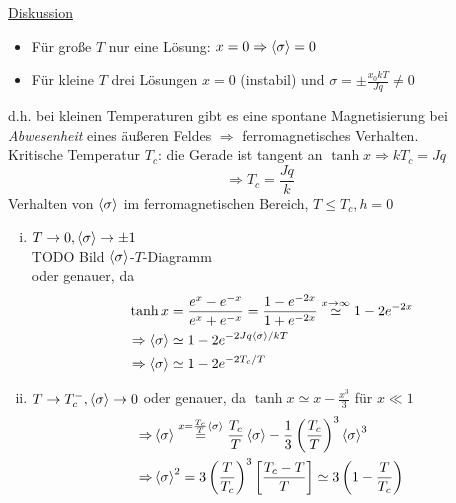 \begin{enumerate}[A)]
    \underline{Diskussion}
    \begin{itemize}
        \item Für große $T$ nur eine Lösung: $x = 0 \Rightarrow \left\langle\sigma\right\rangle = 0$
        \item Für kleine $T$ drei Lösungen $x = 0$ (instabil) und $\sigma = \pm \frac{x_0 k T}{J q} \neq 0$
    \end{itemize}
    d.h. bei kleinen Temperaturen gibt es eine spontane Magnetisierung bei \emph{Abwesenheit} eines äußeren Feldes
    $\Rightarrow$ ferromagnetisches Verhalten. \\
    Kritische Temperatur $T_c$: die Gerade ist tangent an $\tanh x \Rightarrow k T_c = J q$
    \begin{equation}
        \Rightarrow T_c = \frac{J q}{k}
    \end{equation}
    Verhalten von $\left\langle\sigma\right\rangle$ im ferromagnetischen Bereich, $T \leq T_c, h = 0$
    \begin{enumerate}[i)]
        \item $T \to 0, \left\langle\sigma\right\rangle \to \pm 1$ \\
        TODO Bild $\left\langle\sigma\right\rangle$-$T$-Diagramm \\ %
        oder genauer, da
        \begin{equation}
            \begin{split}
                \tanh x &= \frac{e^x - e^{-x}}{e^x + e^{-x}} = \frac{1 - e^{-2x}}{1 + e^{-2x}} \overset{x \to \infty}{\simeq} 1 - 2 e^{-2x} \\
                \Rightarrow \left\langle\sigma\right\rangle &\simeq 1 - 2 e^{- 2 J q \left\langle\sigma\right\rangle / k T} \\
                \Rightarrow \left\langle\sigma\right\rangle &\simeq 1 - 2 e^{-2 T_c / T}
            \end{split}
        \end{equation}
        \item $T \to T_c^-, \left\langle\sigma\right\rangle \to 0$
        oder genauer, da $\tanh x \simeq x - \frac{x^3}{3}$ für $x \ll 1$
        \begin{equation}
            \begin{split}
                \Rightarrow &\avg{\sigma} \overset{x=\frac{T_c}{T}\avg{\sigma}}{=} \frac{T_c}{T} \avg{\sigma} - \frac{1}{3} \left( \frac{T_c}{T} \right)^3 \avg{\sigma}^3 \\
                \Rightarrow &\avg{\sigma}^2 = 3 \left( \frac{T}{T_c} \right)^3 \left[ \frac{T_c - T}{T} \right] \simeq 3 \left( 1 - \frac{T}{T_c} \right) \\

\end{split}
\end{equation}
\end{enumerate}
\end{enumerate}
